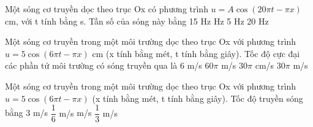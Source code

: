 \begin{vidu}%
Một sóng cơ truyền dọc theo trục Ox có phương trình $u = A\cos(20\pi t - \pi x)$ cm, với t tính bằng s. Tần số của sóng này bằng
\choice
{15 Hz}
{ Hz}
{5 Hz}
{20 Hz}
\end{vidu} 
\begin{vidu}%
Một sóng cơ truyền trong một môi trường dọc theo trục Ox với phương trình $u = 5\cos(6\pi t - \pi x)$ cm (x tính bằng mét, t tính bằng giây). Tốc độ cực đại các phần tử môi trường có sóng truyền qua là
\choice
{6 m/s}
{$60\pi$  m/s}
{\True $30\pi$  cm/s}
{$30\pi$  m/s}
\end{vidu} 


\begin{vidu}%
Một sóng cơ truyền trong một môi trường dọc theo trục Ox với phương trình $u=5\cos \left({6\pi t-\pi x}\right)$ (x tính bằng mét, t tính bằng giây). Tốc độ truyền sóng bằng
\choice
{3 m/s}
{$\dfrac{1}{6}$ m/s}
{ m/s}
{$\dfrac{1}{3}$ m/s}
\end{vidu} 

